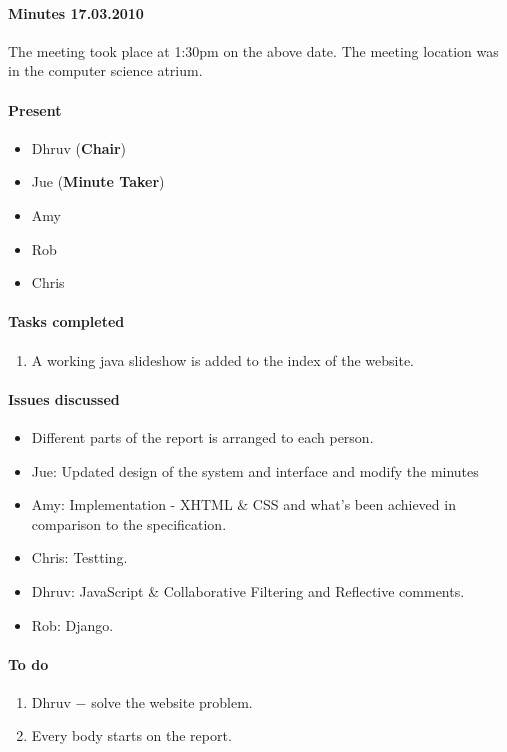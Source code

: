 \paragraph{Minutes 17.03.2010}  
The meeting took place at 1:30pm on the above date. The meeting location was in the computer science atrium. 

\paragraph{Present}

\begin{itemize}
	\item Dhruv (\textbf{Chair})
	\item Jue (\textbf{Minute Taker})
	\item Amy
	\item Rob
	\item Chris
	
\end{itemize}

\paragraph{Tasks completed}

\begin{enumerate}
	\item A working java slideshow is added to the index of the website.
\end{enumerate}

\paragraph{Issues discussed}

\begin{itemize}
	\item Different parts of the report is arranged to each person.
	\item Jue: Updated design of the system and interface and modify the minutes
	\item Amy: Implementation - XHTML \& CSS and what's been achieved in comparison to the specification.
	\item Chris: Testting.
	\item Dhruv: JavaScript \& Collaborative Filtering and Reflective comments.
	\item Rob: Django.
	
\end{itemize}

\paragraph{To do}

\begin{enumerate}
	\item Dhruv $-$ solve the website problem.
	\item Every body starts on the report.
\end{enumerate}